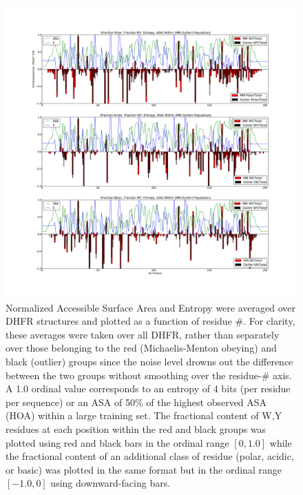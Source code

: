 \documentclass[a4paper,11pt]{article}
\begin{document}
\begin{figure}[a]
\centerline{\includegraphics[width=8in]{AA+S+ASA.pdf}}
\caption[$S_{\rm all}$, $ASA_{\rm all}$, WY/Polar/Acidic/Basic Content vs Residue \#]{Normalized Accessible Surface Area and Entropy were averaged over DHFR structures and plotted as a function of residue \#. For clarity, these averages were taken over all DHFR, rather than separately over those belonging to the red (Michaelis-Menton obeying) and black (outlier) groups since the noise level drowns out the difference between the two groups without smoothing over the residue-\# axis. A 1.0 ordinal value corresponds to an entropy of 4 bits (per residue per sequence) or an ASA of 50\% of the highest observed ASA (HOA) within a large training set. The fractional content of W,Y residues at each position within the red and black groups was plotted using red and black bars in the ordinal range $[0,1.0]$ while the fractional content of an additional class of residue (polar, acidic, or basic) was plotted in the same format but in the ordinal range $[-1.0,0]$ using downward-facing bars.}
\end{figure}
\end{document}
